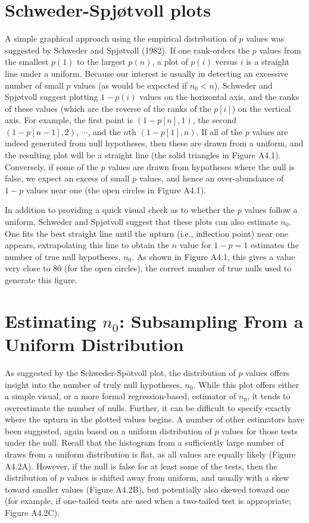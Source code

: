 \documentclass{article}
\begin{document}
\section{Schweder-Spjøtvoll plots}
A simple graphical approach using the empirical distribution of $p$ values was suggested by Schweder and Spjøtvoll (1982). If one rank-orders the $p$ values from the smallest $p(1)$ to the largest $p(n)$, a plot of $p(i)$ versus $i$ is a straight line under a uniform. Because our interest is usually in detecting an excessive number of small $p$ values (as would be expected if $n_0 < n$), Schweder and Spjøtvoll suggest plotting $1 - p(i)$ values on the horizontal axis, and the ranks of these values (which are the reverse of the ranks of the $p[i]$) on the vertical axis. For example, the first point is $(1 - p[n], 1)$, the second $(1 - p[n-1], 2)$, $\cdots$, and the $n$th $(1 - p[1], n)$. If all of the $p$ values are indeed generated from null hypotheses, then these are drawn from a uniform, and the resulting plot will be a straight line (the solid triangles in Figure A4.1). Conversely, if some of the $p$ values are drawn from hypotheses where the null is false, we expect an excess of small $p$ values, and hence an over-abundance of $1 - p$ values near one (the open circles in Figure A4.1).

In addition to providing a quick visual check as to whether the $p$ values follow a uniform, Schweder and Spjøtvoll suggest that these plots can also estimate $n_{0}$. One fits the best straight line until the upturn (i.e., inflection point) near one appears, extrapolating this line to obtain the $n$ value for $1 - p = 1$ estimates the number of true null hypotheses, $n_{0}$. As shown in Figure A4.1, this gives a value very close to 80 (for the open circles), the correct number of true nulls used to generate this figure.

\section{Estimating  $ n_{0} $: Subsampling From a Uniform Distribution}
As suggested by the Schweder-Spötvoll plot, the distribution of $p$ values offers insight into the number of truly null hypotheses, $n_{0}$. While this plot offers either a simple visual, or a more formal regression-based, estimator of $n_{0}$, it tends to overestimate the number of nulls. Further, it can be difficult to specify exactly where the upturn in the plotted values begins. A number of other estimators have been suggested, again based on a uniform distribution of $p$ values for those tests under the null. Recall that the histogram from a sufficiently large number of draws from a uniform distribution is flat, as all values are equally likely (Figure A4.2A). However, if the null is false for at least some of the tests, then the distribution of $p$ values is shifted away from uniform, and usually with a skew toward smaller values (Figure A4.2B), but potentially also skewed toward one (for example, if one-tailed tests are used when a two-tailed test is appropriate; Figure A4.2C).
\end{document}
